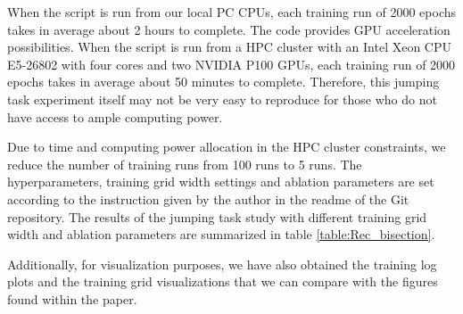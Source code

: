 \documentclass{usiinftr}
\begin{document}
When the script is run from our local PC CPUs, each training run of 2000 epochs takes in average about 2 hours to complete. The code provides GPU acceleration possibilities. When the script is run from a HPC cluster with an Intel Xeon CPU E5-26802 with four cores and two NVIDIA P100 GPUs, each training run of 2000 epochs takes in average about 50 minutes to complete. Therefore, this jumping task experiment itself may not be very easy to reproduce for those who do not have access to ample computing power.

Due to time and computing power allocation in the HPC cluster constraints, we reduce the number of training runs from 100 runs to 5 runs. The hyperparameters, training grid width settings and ablation parameters are set according to the instruction given by the author in the readme of the Git repository. The results of the jumping task study with different training grid width and ablation parameters are summarized in table \ref{table:Rec_bisection}.


Additionally, for visualization purposes, we have also obtained the training log plots and the training grid visualizations that we can compare with the figures found within the paper.
\end{document}
